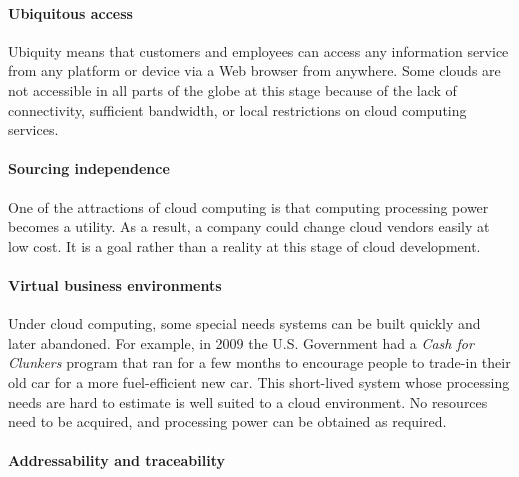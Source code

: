 \documentclass[
]{article}
\begin{document}
\hypertarget{ubiquitous-access}{%
\paragraph*{Ubiquitous access}\label{ubiquitous-access}}

Ubiquity means that customers and employees can access any information
service from any platform or device via a Web browser from anywhere.
Some clouds are not accessible in all parts of the globe at this stage
because of the lack of connectivity, sufficient bandwidth, or local
restrictions on cloud computing services.

\hypertarget{sourcing-independence}{%
\paragraph*{Sourcing independence}\label{sourcing-independence}}

One of the attractions of cloud computing is that computing processing
power becomes a utility. As a result, a company could change cloud
vendors easily at low cost. It is a goal rather than a reality at this
stage of cloud development.

\hypertarget{virtual-business-environments}{%
\paragraph*{Virtual business environments}\label{virtual-business-environments}}

Under cloud computing, some special needs systems can be built quickly
and later abandoned. For example, in 2009 the U.S. Government had a
\emph{Cash for Clunkers} program that ran for a few months to encourage
people to trade-in their old car for a more fuel-efficient new car. This
short-lived system whose processing needs are hard to estimate is well
suited to a cloud environment. No resources need to be acquired, and
processing power can be obtained as required.

\hypertarget{addressability-and-traceability}{%
\paragraph*{Addressability and traceability}\label{addressability-and-traceability}}
\end{document}
